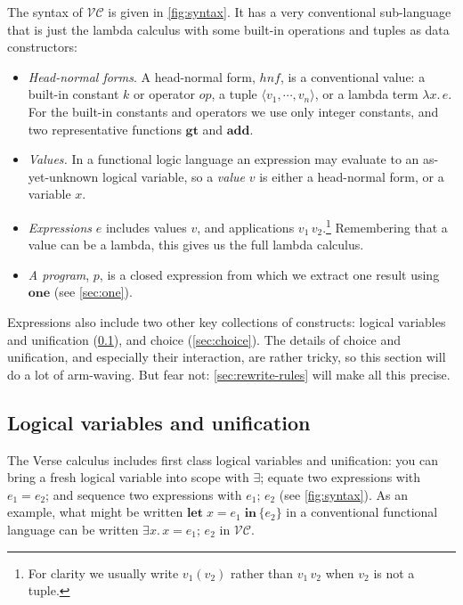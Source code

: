 \documentclass[acmsmall,review,dvipsnames]{acmart}
\newcommand{\Varid}[1]{\mathit{#1}}
\newcommand{\versecalc}{$\mathcal{VC}$}
\begin{document}
The syntax of \versecalc{} is given in \cref{fig:syntax}.
It has a very conventional sub-language that is just the lambda calculus with
some built-in operations and tuples as data constructors:
\begin{itemize}
\item \emph{Head-normal forms}.
  A head-normal form, \ensuremath{\mathit{hnf}}, is a conventional value: a built-in constant \ensuremath{\Varid{k}} or operator \ensuremath{\Varid{op}}, a tuple
  \ensuremath{\langle{}\Varid{v}_{\mathrm{1}},\cdots,\Varid{v}_{\Varid{n}}\rangle}, or a lambda term \ensuremath{\lambda\Varid{x}.\,\Varid{e}}.
For the built-in constants and operators we use only integer constants, and two representative
functions \ensuremath{\textbf{gt}} and \ensuremath{\textbf{add}}.
\item \emph{Values.}
In a functional logic language an expression may evaluate to an as-yet-unknown logical variable,
so a \emph{value} \ensuremath{\Varid{v}} is either a head-normal form, or a variable \ensuremath{\Varid{x}}.
\item \emph{Expressions} \ensuremath{\Varid{e}} includes values \ensuremath{\Varid{v}}, and applications \ensuremath{\Varid{v}_{\mathrm{1}}\,\Varid{v}_{\mathrm{2}}}.\footnote{
For clarity we usually write \ensuremath{\Varid{v}_{\mathrm{1}}(\Varid{v}_{\mathrm{2}})} rather than \ensuremath{\Varid{v}_{\mathrm{1}}\,\Varid{v}_{\mathrm{2}}} when \ensuremath{\Varid{v}_{\mathrm{2}}} is not a tuple. }
Remembering that a value can be a lambda, this gives us the full lambda calculus.
\item \emph{A program}, \ensuremath{\Varid{p}}, is a closed expression from which we extract one result using \ensuremath{\textbf{one}} (see \cref{sec:one}).
\end{itemize}
Expressions also include two other key collections of constructs:
logical variables and unification (\cref{sec:unify}), and choice (\cref{sec:choice}).
The details of choice and unification, and especially their
interaction, are rather tricky, so this section will do a lot of
arm-waving.  But fear not: \cref{sec:rewrite-rules} will make all this
precise.

\subsection{Logical variables and unification} \label{sec:unify}

The Verse calculus includes first class logical variables and unification:
you can bring a fresh logical variable into scope with \ensuremath{\exists}; equate two expressions with \ensuremath{\Varid{e}_{\mathrm{1}}\mathrel{=}\Varid{e}_{\mathrm{2}}}; and
sequence two expressions with \ensuremath{\Varid{e}_{\mathrm{1}};\,\Varid{e}_{\mathrm{2}}} (see \cref{fig:syntax}).
As an example, what might be written \ensuremath{\textbf{let}\;\Varid{x}=\Varid{e}_{\mathrm{1}}\;\textbf{in}\,\{\Varid{e}_{\mathrm{2}}\}} in a conventional functional language can be written
\ensuremath{\exists\Varid{x}.\,\Varid{x}\mathrel{=}\Varid{e}_{\mathrm{1}};\,\Varid{e}_{\mathrm{2}}} in \versecalc{}.
\end{document}
